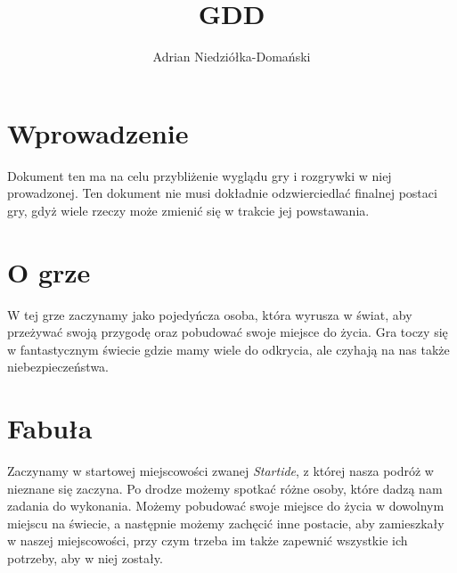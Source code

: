 \documentclass[12pt]{article}
\author{Adrian Niedziółka-Domański}
\title {GDD}
\begin{document}
	\maketitle
	\pagebreak
	\tableofcontents
	\pagebreak
	
	\section{Wprowadzenie}
	Dokument ten ma na celu przybliżenie wyglądu gry i rozgrywki w niej prowadzonej. Ten dokument nie musi dokładnie odzwierciedlać finalnej postaci gry, gdyż wiele rzeczy może zmienić się w trakcie jej powstawania.
	
	\section{O grze}
	W tej grze zaczynamy jako pojedyńcza osoba, która wyrusza w świat, aby przeżywać swoją przygodę oraz pobudować swoje miejsce do życia. Gra toczy się w fantastycznym świecie gdzie mamy wiele do odkrycia, ale czyhają na nas także niebezpieczeństwa.
	
	\section{Fabuła}
	Zaczynamy w startowej miejscowości zwanej \textit{Startide}, z której nasza podróż w nieznane się zaczyna. Po drodze możemy spotkać różne osoby, które dadzą nam zadania do wykonania. Możemy pobudować swoje miejsce do życia w dowolnym miejscu na świecie, a następnie możemy zachęcić inne postacie, aby zamieszkały w naszej miejscowości, przy czym trzeba im także zapewnić wszystkie ich potrzeby, aby w niej zostały.
	
\end{document}
